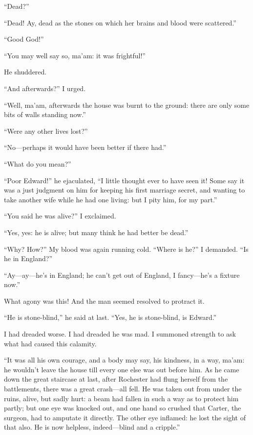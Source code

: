 \enquote{Dead?}

\enquote{Dead! Ay, dead as the stones on which her brains and blood
	were scattered.}

\enquote{Good God!}

\enquote{You may well say so, ma'am: it was frightful!}

He shuddered.

\enquote{And afterwards?} I urged.

\enquote{Well, ma'am, afterwards the house was burnt to the ground:
	there are only some bits of walls standing now.}

\enquote{Were any other lives lost?}

\enquote{No---perhaps it would have been better if there had.}

\enquote{What do you mean?}

\enquote{Poor \Mr{} Edward!} he ejaculated, \enquote{I little thought ever
	to have seen it! Some say it was a just judgment on him for keeping his
	first marriage secret, and wanting to take another wife while he had one
	living: but I pity him, for my part.}

\enquote{You said he was alive?} I exclaimed.

\enquote{Yes, yes: he is alive; but many think he had better be dead.}

\enquote{Why? How?} My blood was again running cold. \enquote{Where
	is he?} I demanded. \enquote{Is he in England?}

\enquote{Ay---ay---he's in England; he can't get out of England, I
	fancy---he's a fixture now.}

What agony was this! And the man seemed resolved to protract it.

\enquote{He is stone-blind,} he said at last. \enquote{Yes, he is
	stone-blind, is \Mr{} Edward.}

I had dreaded worse. I had dreaded he was mad. I summoned strength to
ask what had caused this calamity.

\enquote{It was all his own courage, and a body may say, his kindness,
	in a way, ma'am: he wouldn't leave the house till every one else was out
	before him. As he came down the great staircase at last, after \Mrs{}
	Rochester had flung herself from the battlements, there was a great
	crash---all fell. He was taken out from under the ruins, alive, but
	sadly hurt: a beam had fallen in such a way as to protect him partly;
	but one eye was knocked out, and one hand so crushed that \Mr{} Carter,
	the surgeon, had to amputate it directly. The other eye inflamed: he
	lost the sight of that also. He is now helpless, indeed---blind and a
	cripple.}

